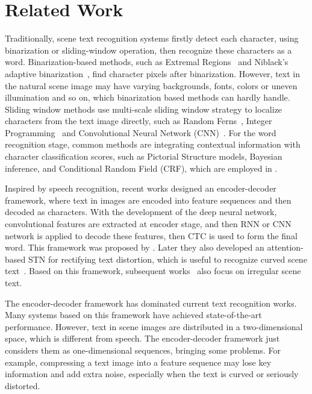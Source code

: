 \documentclass[letterpaper]{article} \usepackage{aaai19}  \usepackage{times}  \usepackage{helvet}  \usepackage{courier}  \usepackage{url}  \usepackage{graphicx}  \frenchspacing  \usepackage{multirow}
\begin{document}
\section{Related Work}
Traditionally, scene text recognition systems firstly detect each character, using binarization or sliding-window operation, then recognize these characters as a word. Binarization-based methods, such as Extremal Regions~\cite{DBLP:conf/eccv/NovikovaBKL12} and Niblack's adaptive binarization~\cite{DBLP:conf/iccv/BissaccoCNN13}, find character pixels after binarization. However, text in the natural scene image may have varying backgrounds, fonts, colors or uneven illumination and so on, which binarization based methods can hardly handle. Sliding window methods use multi-scale sliding window strategy to localize characters from the text image directly, such as Random Ferns~\cite{DBLP:conf/iccv/WangBB11}, Integer Programming~\cite{DBLP:conf/cvpr/SmithFL11} and Convolutional Neural Network (CNN)~\cite{DBLP:conf/eccv/JaderbergVZ14}. For the word recognition stage, common methods are integrating contextual information with character classification scores, such as Pictorial Structure models, Bayesian inference, and Conditional Random Field (CRF), which are employed in \cite{DBLP:conf/iccv/WangBB11,DBLP:journals/pami/WeinmanLH09,DBLP:conf/bmvc/MishraAJ12,DBLP:conf/cvpr/MishraAJ12,DBLP:conf/cvpr/ShiWXZGZ13}.

Inspired by speech recognition, recent works designed an encoder-decoder framework, where text in images are encoded into feature sequences and then decoded as characters. With the development of the deep neural network, convolutional features are extracted at encoder stage, and then RNN or CNN network is applied to decode these features, then CTC is used to form the final word. This framework was proposed by \cite{DBLP:journals/pami/ShiBY17}. Later they also developed an attention-based STN for rectifying text distortion, which is useful to recognize curved scene text~\cite{DBLP:conf/cvpr/ShiWLYB16}. Based on this framework, subsequent works~\cite{conf/aaai/HeH0LT16,DBLP:conf/icfhr/WuYLLW16,DBLP:conf/aaai/LiuCW18} also focus on irregular scene text.

The encoder-decoder framework has dominated current text recognition works. Many systems based on this framework have achieved state-of-the-art performance. However, text in scene images are distributed in a two-dimensional space, which is different from speech. The encoder-decoder framework just considers them as one-dimensional sequences, bringing some problems. For example, compressing a text image into a feature sequence may lose key information and add extra noise, especially when the text is curved or seriously distorted. 
\end{document}

